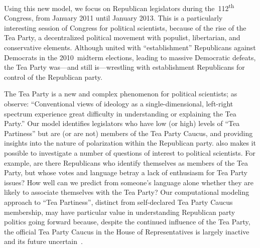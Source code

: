Using this new model, we focus on Republican legislators during
the~112\textsuperscript{th} \us{} Congress, from January 2011 until
January 2013.  This is a particularly interesting session of Congress
for political scientists, because of the rise of the Tea Party, a
decentralized political movement with populist, libertarian, and
conservative elements.  Although united with ``establishment''
Republicans against Democrats in the 2010~midterm elections,
leading to massive Democratic defeats, the Tea Party was---and still
is---wrestling with establishment Republicans for control of the
Republican party.

The Tea Party is a new and complex phenomenon for political
scientists; as  observe: ``Conventional views
of ideology as a single-dimensional, left-right spectrum experience
great difficulty in understanding or explaining the Tea Party.''  Our
model identifies legislators who have low (or high) levels of ``Tea
Partiness'' but are (or are not) members of the Tea Party Caucus, 
and providing insights into the nature of polarization within the
Republican party. \name{} also makes it possible to investigate a number of questions of interest to
political scientists. For example, are there Republicans who identify
themselves as members of the Tea Party, but whose votes and language
betray a lack of enthusiasm for Tea Party issues?  How well can we
predict from someone's language alone whether they are likely to
associate themselves with the Tea Party?  Our computational modeling approach to ``Tea
Partiness'', distinct from self-declared Tea Party Caucus membership, 
may have particular value in understanding Republican
party politics going forward because, despite the continued
influence of the Tea Party, the official Tea Party Caucus in the
House of Representatives is largely inactive and its future uncertain~\cite{fuller2015}.




